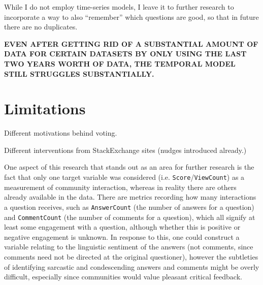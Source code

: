 \documentclass[11pt,preprint, authoryear]{article}
\numberwithin{equation}{section}
\begin{document}
\normalsize

While I do not employ time-series models, I leave it to further research
to incorporate a way to also ``remember'' which questions are good, so
that in future there are no duplicates.

\textbf{EVEN AFTER GETTING RID OF A SUBSTANTIAL AMOUNT OF DATA FOR
CERTAIN DATASETS BY ONLY USING THE LAST TWO YEARS WORTH OF DATA, THE
TEMPORAL MODEL STILL STRUGGLES SUBSTANTIALLY.}

\section{\texorpdfstring{Limitations
\label{Limit}}{Limitations }}\label{limitations}

Different motivations behind voting.

Different interventions from StackExchange sites (nudges introduced
already.)

One aspect of this research that stands out as an area for further
research is the fact that only one target variable was considered (i.e.
\texttt{Score}/\texttt{ViewCount}) as a measurement of community
interaction, whereas in reality there are others already available in
the data. There are metrics recording how many interactions a question
receives, such as \texttt{AnswerCount} (the number of answers for a
question) and \texttt{CommentCount} (the number of comments for a
question), which all signify at least some engagement with a question,
although whether this is positive or negative engagement is unknown. In
response to this, one could construct a variable relating to the
linguistic sentiment of the answers (not comments, since comments need
not be directed at the original questioner), however the subtleties of
identifying sarcastic and condescending answers and comments might be
overly difficult, especially since communities would value pleasant
critical feedback.
\end{document}
